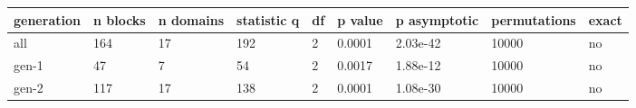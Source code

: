 \begin{tabular}{lllllllll}
\toprule
generation & n blocks & n domains & statistic q & df & p value & p asymptotic & permutations & exact \\
\midrule
all & 164 & 17 & 192 & 2 & 0.0001 & 2.03e-42 & 10000 & no \\
gen-1 & 47 & 7 & 54 & 2 & 0.0017 & 1.88e-12 & 10000 & no \\
gen-2 & 117 & 17 & 138 & 2 & 0.0001 & 1.08e-30 & 10000 & no \\
\bottomrule
\end{tabular}
